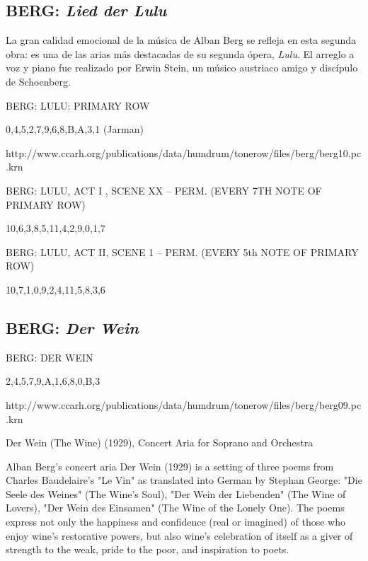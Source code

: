     	\subsection{BERG: \textit{Lied der Lulu}}
        	La gran calidad emocional de la música de Alban Berg se refleja en esta segunda obra: es una de las arias más destacadas de su segunda ópera, \textit{Lulu}. El arreglo a voz y piano fue realizado por Erwin Stein, un músico austriaco amigo y discípulo de Schoenberg.
        	
        	

BERG: LULU: PRIMARY ROW

{0,4,5,2,7,9,6,8,B,A,3,1} (Jarman)

http://www.ccarh.org/publications/data/humdrum/tonerow/files/berg/berg10.pc.krn


BERG: LULU, ACT I , SCENE XX -- PERM. (EVERY 7TH NOTE OF PRIMARY ROW)

{10,6,3,8,5,11,4,2,9,0,1,7}


BERG: LULU, ACT II, SCENE 1 -- PERM. (EVERY 5th NOTE OF PRIMARY ROW)

{10,7,1,0,9,2,4,11,5,8,3,6}
            
        
        \subsection{BERG: \textit{Der Wein}}
        
        BERG: DER WEIN
        
        {2,4,5,7,9,A,1,6,8,0,B,3}
        
        http://www.ccarh.org/publications/data/humdrum/tonerow/files/berg/berg09.pc.krn
        
        Der Wein (The Wine) (1929), Concert Aria for Soprano and Orchestra
        
        Alban Berg's concert aria Der Wein (1929) is a setting of three poems from Charles Baudelaire's "Le Vin" as translated into German by Stephan George: "Die Seele des Weines" (The Wine's Soul), "Der Wein der Liebenden" (The Wine of Lovers), "Der Wein des Einsamen" (The Wine of the Lonely One). The poems express not only the happiness and confidence (real or imagined) of those who enjoy wine's restorative powers, but also wine's celebration of itself as a giver of strength to the weak, pride to the poor, and inspiration to poets.


